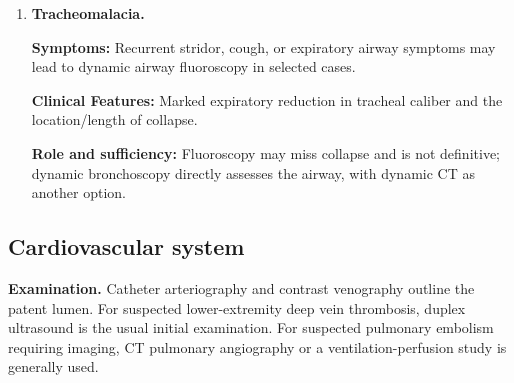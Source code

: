 \begin{enumerate}[leftmargin=*,itemsep=0.45em,topsep=0.4em]
\item \textbf{Tracheomalacia.}\par\noindent\textbf{Symptoms:} Recurrent stridor, cough, or expiratory airway symptoms may lead to dynamic airway fluoroscopy in selected cases.\par\noindent\textbf{Clinical Features:} Marked expiratory reduction in tracheal caliber and the location/length of collapse.\par\noindent\textbf{Role and sufficiency:} Fluoroscopy may miss collapse and is not definitive; dynamic bronchoscopy directly assesses the airway, with dynamic CT as another option.
\end{enumerate}

\subsection{Cardiovascular system}
\textbf{Examination.} Catheter arteriography and contrast venography outline the patent lumen. For suspected lower-extremity deep vein thrombosis, duplex ultrasound is the usual initial examination. For suspected pulmonary embolism requiring imaging, CT pulmonary angiography or a ventilation-perfusion study is generally used.

